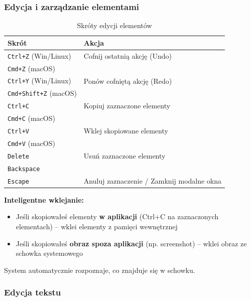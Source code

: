 \documentclass[12pt,a4paper]{article}
\begin{document}
\subsubsection{Edycja i zarządzanie elementami}

\begin{table}[H]
\centering
\begin{tabular}{|l|l|}
\hline
\textbf{Skrót} & \textbf{Akcja} \\
\hline
\texttt{Ctrl+Z} (Win/Linux) & Cofnij ostatnią akcję (Undo) \\
\texttt{Cmd+Z} (macOS) & \\
\hline
\texttt{Ctrl+Y} (Win/Linux) & Ponów cofniętą akcję (Redo) \\
\texttt{Cmd+Shift+Z} (macOS) & \\
\hline
\texttt{Ctrl+C} & Kopiuj zaznaczone elementy \\
\texttt{Cmd+C} (macOS) & \\
\hline
\texttt{Ctrl+V} & Wklej skopiowane elementy \\
\texttt{Cmd+V} (macOS) & \\
\hline
\texttt{Delete} & Usuń zaznaczone elementy \\
\texttt{Backspace} & \\
\hline
\texttt{Escape} & Anuluj zaznaczenie / Zamknij modalne okna \\
\hline
\end{tabular}
\caption{Skróty edycji elementów}
\label{tab:edit_shortcuts}
\end{table}

\begin{tcolorbox}[colback=yellow!10!white,colframe=orange!75!black,title=\faExclamationTriangle\ Uwaga -- Kopiowanie i wklejanie]
\textbf{Inteligentne wklejanie:}
\begin{itemize}
    \item Jeśli skopiowałeś elementy \textbf{w aplikacji} (Ctrl+C na zaznaczonych elementach) -- wklei elementy z pamięci wewnętrznej
    \item Jeśli skopiowałeś \textbf{obraz spoza aplikacji} (np. screenshot) -- wklei obraz ze schowka systemowego
\end{itemize}
System automatycznie rozpoznaje, co znajduje się w schowku.
\end{tcolorbox}

\subsubsection{Edycja tekstu}
\end{document}

